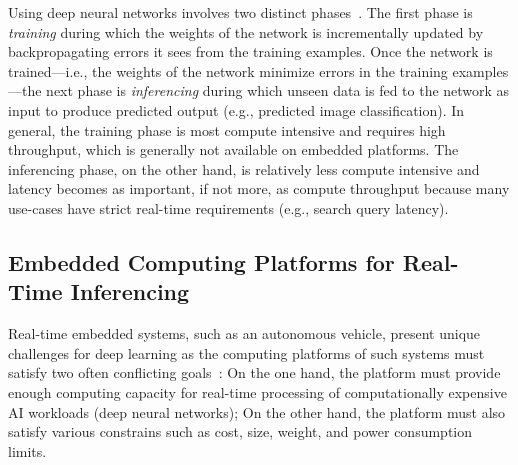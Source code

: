 Using deep neural networks involves two distinct
phases~\cite{NVIDIA2015}. The first
phase is \emph{training} during which the weights of the network is
incrementally updated by backpropagating errors it sees from the
training examples. Once the network is trained---i.e., the weights of
the network minimize errors in the training examples---the next phase
is \emph{inferencing} during which unseen data is fed to the network
as input to produce predicted output (e.g., predicted image
classification). In general, the training phase is most compute
intensive and requires high throughput, which is generally not
available on embedded platforms. The inferencing phase, on the
other hand, is relatively less compute intensive and latency becomes
as important, if not more, as compute throughput because many
use-cases have strict real-time requirements (e.g., search query
latency).





\subsection{Embedded Computing Platforms for Real-Time Inferencing}
Real-time embedded systems, such as an autonomous vehicle, present
unique challenges for deep learning as the computing platforms of such
systems must satisfy two often conflicting goals~\cite{Otterness2017}:
On the one hand, the platform must provide 
enough computing capacity for real-time processing of computationally
expensive AI workloads (deep neural networks);
On the other hand, the platform must also satisfy various
constrains such as cost, size, weight, and power consumption limits.

